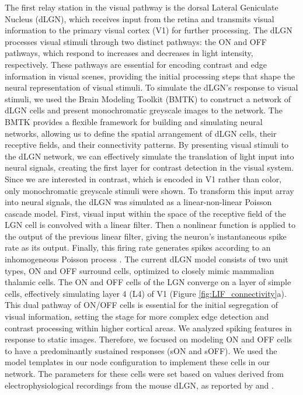 \documentclass[12pt]{article}
\begin{document}
The first relay station in the visual pathway is the dorsal Lateral Geniculate Nucleus (dLGN), which receives input from the retina and transmits visual information to the primary visual cortex (V1) for further processing. The dLGN processes visual stimuli through two distinct pathways: the ON and OFF pathways, which respond to increases and decreases in light intensity, respectively. These pathways are essential for encoding contrast and edge information in visual scenes, providing the initial processing steps that shape the neural representation of visual stimuli. To simulate the dLGN's response to visual stimuli, we used the Brain Modeling Toolkit (BMTK) to construct a network of dLGN cells and present monochromatic greyscale images to the network. The BMTK provides a flexible framework for building and simulating neural networks, allowing us to define the spatial arrangement of dLGN cells, their receptive fields, and their connectivity patterns. By presenting visual stimuli to the dLGN network, we can effectively simulate the translation of light input into neural signals, creating the first layer for contrast detection in the visual system. Since we are interested in contrast, which is encoded in V1 rather than color, only monochromatic greyscale stimuli were shown. To transform this input array into neural signals, the dLGN was simulated as a linear-non-linear Poisson cascade model. First, visual input within the space of the receptive field of the LGN cell is convolved with a linear filter. Then a nonlinear function is applied to the output of the previous linear filter, giving the neuron's instantaneous spike rate as its output. Finally, this firing rate generates spikes according to an inhomogeneous Poisson process \autocite{moskovitzComparisonDeepLearning2018}. The current dLGN model consists of two unit types, ON and OFF surround cells, optimized to closely mimic mammalian thalamic cells. The ON and OFF cells of the LGN converge on a layer of simple cells, effectively simulating layer 4 (L4) of V1 (Figure \ref{fig:LIF_connectivity}a). This dual pathway of ON/OFF cells is essential for the initial segregation of visual information, setting the stage for more complex edge detection and contrast processing within higher cortical areas. We analyzed spiking features in response to static images. Therefore, we focused on modeling ON and OFF cells to have a predominantly sustained responses (sON and sOFF). We used the model templates in our node configuration to implement these cells in our network. The parameters for these cells were set based on values derived from electrophysiological recordings from the mouse dLGN, as reported by \textcite{durandComparisonVisualResponse2016} and \textcite{billehSystematicIntegrationStructural2020}.
\end{document}
